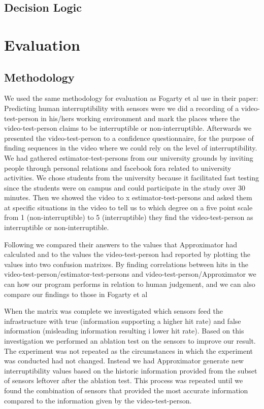\documentclass{sigchi}
\begin{document}
\subsection{Decision Logic}

\section{Evaluation}

\subsection{Methodology}
We used the same methodology for evaluation as Fogarty et al use in their paper: Predicting human interruptibility with sensors\cite{Fogarty:2005:PHI:1057237.1057243} were we did a recording of a video-test-person in his/hers working environment and mark the places where the video-test-person claims to be interruptible or non-interruptible. Afterwards we presented the video-test-person to a confidence questionnaire, for the purpose of finding sequences in the video where we could rely on the level of interruptibility.
We had gathered estimator-test-persons from our university grounds by inviting people through personal relations and facebook fora related to university activities.
We chose students from the university because it facilitated fast testing since the students were on campus and could participate in the study over 30 minutes.
Then we showed the video to x estimator-test-persons and asked them at specific situations in the video to tell us to which degree on a five point scale from 1 (non-interruptible) to 5 (interruptible) they find the video-test-person as interruptible or non-interruptible.

Following we compared their answers to the values that Approximator had calculated and to the values the video-test-person had reported by plotting the values into two confusion matrixes.
By finding correlations between hits in the video-test-person/estimator-test-persons and video-test-person/Approximator we can how our program performs in relation to human judgement, and we can also compare our findings to those in Fogarty et al \cite{Fogarty:2005:PHI:1057237.1057243}

When the matrix was complete we investigated which sensors feed the infrastructure with true (information supporting a higher hit rate) and false information (misleading information resulting i lower hit rate).
Based on this investigation we performed an ablation test on the sensors to improve our result.
The experiment was not repeated as the circumstances in which the experiment was conducted had not changed.
Instead we had Approximator generate new interruptibility values based on the historic information provided from the subset of sensors leftover after the ablation test.
This process was repeated until we found the combination of sensors that provided the most accurate information compared to the information given by the video-test-person.
\end{document}
